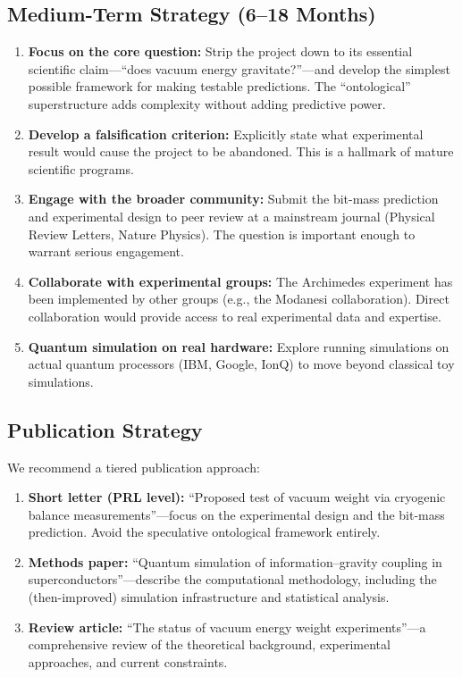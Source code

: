 \documentclass[11pt,a4paper]{article}
\begin{document}
\subsection{Medium-Term Strategy (6--18 Months)}

\begin{enumerate}[leftmargin=1.5em]
  \item \textbf{Focus on the core question:} Strip the project down to its essential scientific claim---``does vacuum energy gravitate?''---and develop the simplest possible framework for making testable predictions. The ``ontological'' superstructure adds complexity without adding predictive power.
  
  \item \textbf{Develop a falsification criterion:} Explicitly state what experimental result would cause the project to be abandoned. This is a hallmark of mature scientific programs.
  
  \item \textbf{Engage with the broader community:} Submit the bit-mass prediction and experimental design to peer review at a mainstream journal (Physical Review Letters, Nature Physics). The question is important enough to warrant serious engagement.
  
  \item \textbf{Collaborate with experimental groups:} The Archimedes experiment has been implemented by other groups (e.g., the Modanesi collaboration). Direct collaboration would provide access to real experimental data and expertise.
  
  \item \textbf{Quantum simulation on real hardware:} Explore running simulations on actual quantum processors (IBM, Google, IonQ) to move beyond classical toy simulations.
\end{enumerate}

\subsection{Publication Strategy}

We recommend a tiered publication approach:

\begin{enumerate}[leftmargin=1.5em]
  \item \textbf{Short letter (PRL level):} ``Proposed test of vacuum weight via cryogenic balance measurements''---focus on the experimental design and the bit-mass prediction. Avoid the speculative ontological framework entirely.
  \item \textbf{Methods paper:} ``Quantum simulation of information--gravity coupling in superconductors''---describe the computational methodology, including the (then-improved) simulation infrastructure and statistical analysis.
  \item \textbf{Review article:} ``The status of vacuum energy weight experiments''---a comprehensive review of the theoretical background, experimental approaches, and current constraints.
\end{enumerate}
\end{document}

